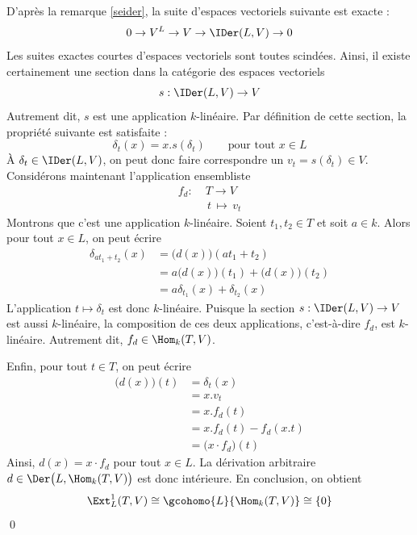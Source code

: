 \begin{Prop}
\begin{pre}
D'après la remarque \ref{seider}, la suite d'espaces vectoriels suivante est exacte :
$$ 0 \rightarrow V^L \rightarrow V \rightarrow \IDer(L,V) \rightarrow 0 $$
Les suites exactes courtes d'espaces vectoriels sont toutes scindées. Ainsi, il existe certainement une section dans la catégorie des espaces vectoriels
$$s : \IDer(L,V) \rightarrow V$$
Autrement dit, $s$ est une application $k$-linéaire. Par définition de cette section, la propriété suivante est satisfaite :
$$ \delta_t(x) =x.s(\delta_t) \qquad \text{pour tout } x \in L $$ 
À $\delta_t \in \IDer(L,V)$, on peut donc faire correspondre un $v_t = s(\delta_t) \in V$.  Considérons maintenant l'application ensembliste
\begin{align*}
f_d : \; &T \longrightarrow V\\
&\,t \, \longmapsto \, v_t
\end{align*}
Montrons que c'est une application $k$-linéaire. Soient $t_1,t_2 \in T$ et soit $a \in k$. Alors pour tout $x \in L$, on peut écrire
\begin{align*}
\delta_{at_1+t_2}(x) &= \big(d(x)\big)(at_1+t_2)\\
&=a\big(d(x)\big)(t_1)+\big(d(x)\big)(t_2)\\
&=a\delta_{t_1}(x)+\delta_{t_2}(x)
\end{align*}
L'application $t \mapsto \delta_t$ est donc $k$-linéaire. Puisque la section $s : \IDer(L,V) \rightarrow V$ est aussi $k$-linéaire, la composition de ces deux applications, c'est-à-dire $f_d$, est $k$-linéaire. Autrement dit, $f_d \in \Hom_k(T,V)$.

Enfin, pour tout $t \in T$, on peut écrire
\begin{align*}
\big(d(x)\big)(t) &= \delta_t(x)\\
&= x.v_t\\
&= x.f_d(t)\\
&= x.f_d(t) - f_d(x.t)\\
&= \big(x \cdot f_d\big)(t)
\end{align*}
Ainsi, $d(x) = x \cdot f_d$ pour tout $x \in L$. La dérivation arbitraire $d \in \Der\big(L,\Hom_k(T,V)\big)$ est donc intérieure. En conclusion, on obtient
$$ \Ext_L^1(T,V) \cong \gcohomo{L}{\Hom_k(T,V)} \cong \{0\} $$
\vspace{-2em}
\qed
\end{pre}
\end{Prop}

